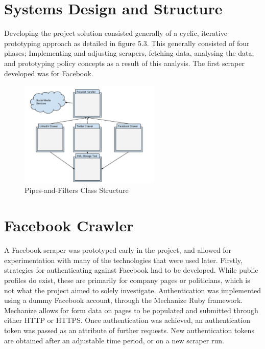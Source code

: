 \section{Systems Design and Structure}

Developing the project solution consisted generally of a cyclic, iterative prototyping approach as detailed in figure 5.3. This generally consisted of four phases; Implementing and adjusting scrapers, fetching data, analysing the data, and prototyping policy concepts as a result of this analysis. The first scraper developed was for Facebook. 

\begin{figure}[h!]
\centering
\includegraphics[width=0.6\textwidth]{Images/Code_Reuse.pdf}
\caption{Pipes-and-Filters Class Structure}
\end{figure}

\section{Facebook Crawler}

A Facebook scraper was prototyped early in the project, and allowed for experimentation with many of the technologies that were used later. Firstly, strategies for authenticating against Facebook had to be developed. While public profiles do exist, these are primarily for company pages or politicians, which is not what the project aimed to solely investigate. Authentication was implemented using a dummy Facebook account, through the Mechanize Ruby framework. Mechanize allows for form data on pages to be populated and submitted through either HTTP or HTTPS. Once authentication was achieved, an authentication token was passed as an attribute of further requests. New authentication tokens are obtained after an adjustable time period, or on a new scraper run. 

